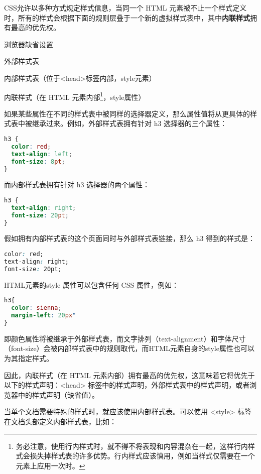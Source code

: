 CSS允许以多种方式规定样式信息，当同一个 HTML 元素被不止一个样式定义时，所有的样式会根据下面的规则层叠于一个新的虚拟样式表中，其中\textbf{内联样式}拥有最高的优先权。

\begin{compactitem}
\item 浏览器缺省设置
\item 外部样式表
\item 内部样式表（位于<head>标签内部，style元素）
\item 内联样式（在 HTML 元素内部\footnote{务必注意，使用行内样式时，就不得不将表现和内容混杂在一起，这样行内样式会损失掉样式表的许多优势。行内样式应该慎用，例如当样式仅需要在一个元素上应用一次时。}，style属性）
\end{compactitem}

如果某些属性在不同的样式表中被同样的选择器定义，那么属性值将从更具体的样式表中被继承过来。例如，外部样式表拥有针对 h3 选择器的三个属性：

\begin{lstlisting}[language=CSS]
h3 {
  color: red;
  text-align: left;
  font-size: 8pt;
}
\end{lstlisting}

而内部样式表拥有针对 h3 选择器的两个属性：

\begin{lstlisting}[language=CSS]
h3 {
  text-align: right; 
  font-size: 20pt;
}
\end{lstlisting}

假如拥有内部样式表的这个页面同时与外部样式表链接，那么 h3 得到的样式是：

\begin{lstlisting}[language=CSS]
color: red; 
text-align: right; 
font-size: 20pt;
\end{lstlisting}

HTML元素的style 属性可以包含任何 CSS 属性，例如：

\begin{lstlisting}[language=CSS]
h3{
  color: sienna; 
  margin-left: 20px"
}
\end{lstlisting}

即颜色属性将被继承于外部样式表，而文字排列（text-alignment）和字体尺寸（font-size）会被内部样式表中的规则取代，而HTML元素自身的style属性也可以为其指定样式。

因此，内联样式（在 HTML 元素内部）拥有最高的优先权，这意味着它将优先于以下的样式声明：<head> 标签中的样式声明，外部样式表中的样式声明，或者浏览器中的样式声明（缺省值）。

当单个文档需要特殊的样式时，就应该使用内部样式表。可以使用 <style> 标签在文档头部定义内部样式表，比如：

